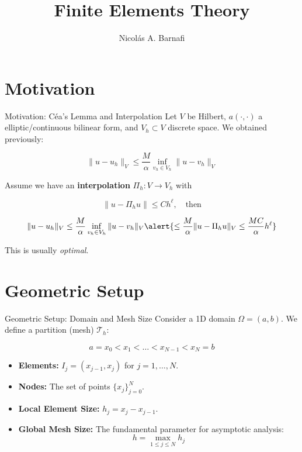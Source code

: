 \documentclass[aspectratio=169]{beamer}
\title[Finite Elements I]{Finite Elements Theory}
\author{Nicol\'as A. Barnafi}
\date{}
\begin{document}
\begin{frame}
    \titlepage
\end{frame}

\section{Motivation}

\begin{frame}{Motivation: Céa's Lemma and Interpolation}
    Let $V$ be Hilbert, $a(\cdot,\cdot)$ a elliptic/continuous bilinear form, and $V_h \subset V$ discrete space. We obtained previously:

    $$ \|u - u_h\|_V \leq \frac{M}{\alpha} \inf_{v_h \in V_h} \|u - v_h\|_V$$

    \vspace{0.3cm}
    \pause Assume we have an \textbf{interpolation} $\Pi_h : V \to V_h$ with 

        $$ \| u - \Pi_h u \| \leq C h^\ell, \quad\text{then}$$ \pause

        $$ \|u - u_h\|_V \leq \frac{M}{\alpha} \inf_{v_h \in V_h} \|u - v_h\|_V \alert{\leq \frac{M}{\alpha} \|u - \Pi_h u\|_V \leq \frac{MC}{\alpha} h^\ell }$$

        This is usually \emph{optimal}.
\end{frame}

\section{Geometric Setup}

\begin{frame}{Geometric Setup: Domain and Mesh Size}
    Consider a 1D domain $\Omega = (a, b)$. We define a partition (mesh) $\mathcal{T}_h$:

    $$ a = x_0 < x_1 < \dots < x_{N-1} < x_N = b $$

    \begin{itemize}
        \item \textbf{Elements:} $I_j = (x_{j-1}, x_j)$ for $j = 1, \dots, N$.
        \item \textbf{Nodes:} The set of points $\{x_j\}_{j=0}^N$.
        \item \textbf{Local Element Size:} $h_j = x_j - x_{j-1}$.
        \item \textbf{Global Mesh Size:} The fundamental parameter for asymptotic analysis:
        $$ h = \max_{1 \leq j \leq N} h_j $$
    \end{itemize}
\end{frame}
\end{document}
